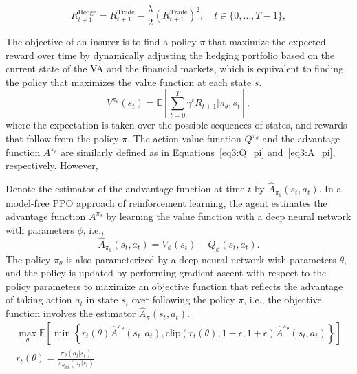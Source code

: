 \begin{equation} \label{eq3:rewardHedging}
    R_{t+1}^{\text{Hedge}} = R_{t+1}^{\text{Trade}} - \frac{\lambda}{2}(R_{t+1}^{\text{Trade}})^2, \quad t \in \{0,\ldots,T-1\},
\end{equation}

The objective of an insurer is to find a policy $\pi$ that maximize the expected reward over time by dynamically adjusting the hedging portfolio based on the current state of the VA and the financial markets, which is equivalent to finding the policy that maximizes the value function at each state $s$.
\begin{equation}
    V^{\pi_{\theta}}(s_t) = \mathbb{E}\left[\sum_{t=0}^{T} \gamma^t R_{t+1} | \pi_{\theta}, s_t\right],
\end{equation}
where the expectation is taken over the possible sequences of states, and rewards that follow from the policy $\pi$.
The action-value function $Q^{\pi_{\theta}}$ and the advantage function $A^{\pi_{\theta}}$ are similarly defined as in Equations~\ref{eq3:Q_pi} and~\ref{eq3:A_pi}, respectively.
However, 

Denote the estimator of the andvantage function at time $t$ by $\hat{A}_{\pi_{\theta}}(s_t, a_t)$.
In a model-free PPO approach of reinforcement learning, the agent estimates the advantage function $A^{\pi_{\theta}}$ by learning the value function with a deep neural network with parameters $\phi$, i.e.,
\begin{equation}
    \hat{A}_{\pi_{\theta}}(s_t, a_t) = V_{\phi}(s_t) - Q_{\phi}(s_t, a_t).
\end{equation}
The policy $\pi_\theta$ is also parameterized by a deep neural network with parameters $\theta$, and the policy is updated by performing gradient ascent with respect to the policy parameters to maximize an objective function that reflects the advantage of taking action $a_t$ in state $s_t$ over following the policy $\pi$, i.e., the objective function involves the estimator $\hat{A}_{\pi}(s_t, a_t)$.
\begin{align}
    \max_{\theta} \mathbb{E}\left[ \min \left\{ r_t(\theta)\hat{A}^{\pi_{\theta}}(s_t, a_t), \text{clip}(r_t(\theta), 1-\epsilon, 1 + \epsilon) \hat{A}^{\pi_{\theta}}(s_t, a_t)  \right\} \right] \\
    r_t(\theta) = \frac{\pi_{\theta}(a_t|s_t)}{\pi_{\theta_{old}}(a_t|s_t)} 
\end{align}

